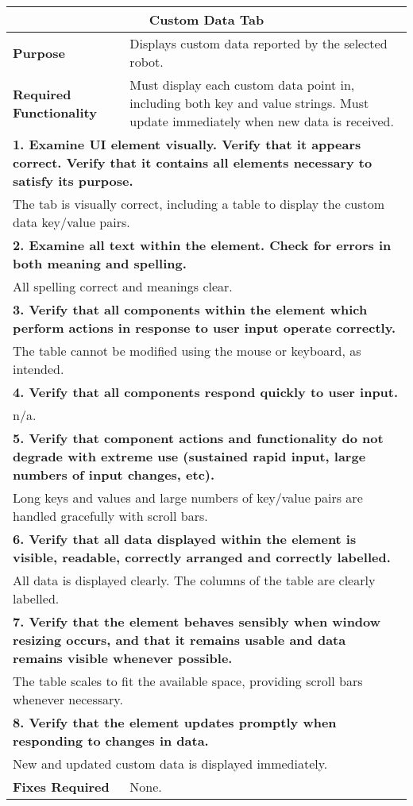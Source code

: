 \begin{longtable}{ l p{10cm} }
 \hline
 \multicolumn{2}{c}{\textbf{Custom Data Tab}}\\
 \hline
 \textbf{Purpose} & Displays custom data reported by the selected robot.\\
 \textbf{Required Functionality} & Must display each custom data point in, including both key and value strings. Must update immediately when new data is received.\\
 \hline
 \multicolumn{2}{p{14cm}}{\textbf{1. Examine UI element visually. Verify that it appears correct. Verify that it contains all elements necessary to satisfy its purpose.}}\\
 \multicolumn{2}{p{14cm}}{The tab is visually correct, including a table to display the custom data key/value pairs.}\\
 \hline
 \multicolumn{2}{p{14cm}}{\textbf{2. Examine all text within the element. Check for errors in both meaning and spelling.}}\\
 \multicolumn{2}{p{14cm}}{All spelling correct and meanings clear.}\\
 \hline
 \multicolumn{2}{p{14cm}}{\textbf{3. Verify that all components within the element which perform actions in response to user input operate correctly.}}\\
 \multicolumn{2}{p{14cm}}{The table cannot be modified using the mouse or keyboard, as intended.}\\
 \hline
 \multicolumn{2}{p{14cm}}{\textbf{4. Verify that all components respond quickly to user input.}}\\
 \multicolumn{2}{p{14cm}}{n/a.}\\
 \hline
 \multicolumn{2}{p{14cm}}{\textbf{5. Verify that component actions and functionality do not degrade with extreme use (sustained rapid input, large numbers of input changes, etc).}}\\
 \multicolumn{2}{p{14cm}}{Long keys and values and large numbers of key/value pairs are handled gracefully with scroll bars.}\\
 \hline
 \multicolumn{2}{p{14cm}}{\textbf{6. Verify that all data displayed within the element is visible, readable, correctly arranged and correctly labelled.}}\\
 \multicolumn{2}{p{14cm}}{All data is displayed clearly. The columns of the table are clearly labelled.}\\
 \hline
 \multicolumn{2}{p{14cm}}{\textbf{7. Verify that the element behaves sensibly when window resizing occurs, and that it remains usable and data remains visible whenever possible.}}\\
 \multicolumn{2}{p{14cm}}{The table scales to fit the available space, providing scroll bars whenever necessary.}\\
 \hline
 \multicolumn{2}{p{14cm}}{\textbf{8. Verify that the element updates promptly when responding to changes in data.}}\\
 \multicolumn{2}{p{14cm}}{New and updated custom data is displayed immediately.}\\
 \hline
 \textbf{Fixes Required} & None.\\
 \bottomrule
\end{longtable}
\clearpage

